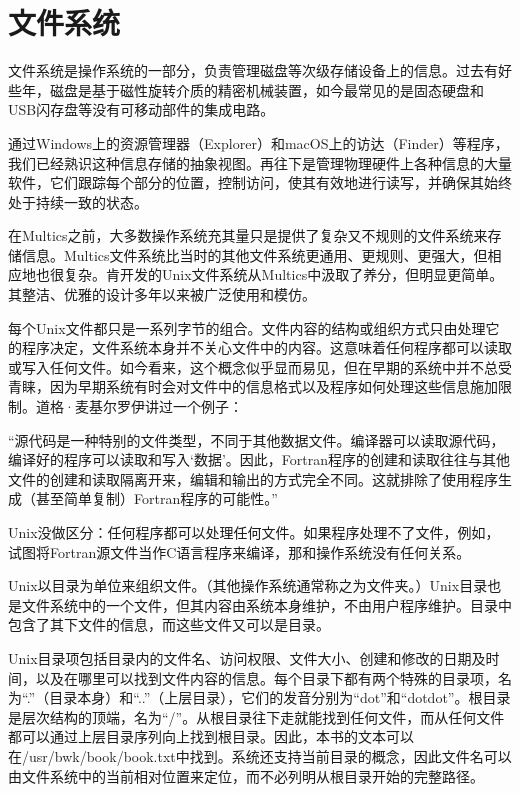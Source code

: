 \documentclass[a4paper,12pt,UTF8,twoside]{ctexbook}
\begin{document}
\section{文件系统}

文件系统是操作系统的一部分，负责管理磁盘等次级存储设备上的信息。过去有好些年，磁盘是基于磁性旋转介质的精密机械装置，如今最常见的是固态硬盘和USB闪存盘等没有可移动部件的集成电路。

通过Windows上的资源管理器（Explorer）和macOS上的访达（Finder）等程序，我们已经熟识这种信息存储的抽象视图。再往下是管理物理硬件上各种信息的大量软件，它们跟踪每个部分的位置，控制访问，使其有效地进行读写，并确保其始终处于持续一致的状态。

在Multics之前，大多数操作系统充其量只是提供了复杂又不规则的文件系统来存储信息。Multics文件系统比当时的其他文件系统更通用、更规则、更强大，但相应地也很复杂。肯开发的Unix文件系统从Multics中汲取了养分，但明显更简单。其整洁、优雅的设计多年以来被广泛使用和模仿。

每个Unix文件都只是一系列字节的组合。文件内容的结构或组织方式只由处理它的程序决定，文件系统本身并不关心文件中的内容。这意味着任何程序都可以读取或写入任何文件。如今看来，这个概念似乎显而易见，但在早期的系统中并不总受青睐，因为早期系统有时会对文件中的信息格式以及程序如何处理这些信息施加限制。道格·麦基尔罗伊讲过一个例子：

“源代码是一种特别的文件类型，不同于其他数据文件。编译器可以读取源代码，编译好的程序可以读取和写入‘数据’。因此，Fortran程序的创建和读取往往与其他文件的创建和读取隔离开来，编辑和输出的方式完全不同。这就排除了使用程序生成（甚至简单复制）Fortran程序的可能性。”

Unix没做区分：任何程序都可以处理任何文件。如果程序处理不了文件，例如，试图将Fortran源文件当作C语言程序来编译，那和操作系统没有任何关系。

Unix以目录为单位来组织文件。（其他操作系统通常称之为文件夹。）Unix目录也是文件系统中的一个文件，但其内容由系统本身维护，不由用户程序维护。目录中包含了其下文件的信息，而这些文件又可以是目录。

Unix目录项包括目录内的文件名、访问权限、文件大小、创建和修改的日期及时间，以及在哪里可以找到文件内容的信息。每个目录下都有两个特殊的目录项，名为“.”（目录本身）和“..”（上层目录），它们的发音分别为“dot”和“dotdot”。根目录是层次结构的顶端，名为“/”。从根目录往下走就能找到任何文件，而从任何文件都可以通过上层目录序列向上找到根目录。因此，本书的文本可以在/usr/bwk/book/book.txt中找到。系统还支持当前目录的概念，因此文件名可以由文件系统中的当前相对位置来定位，而不必列明从根目录开始的完整路径。
\end{document}
